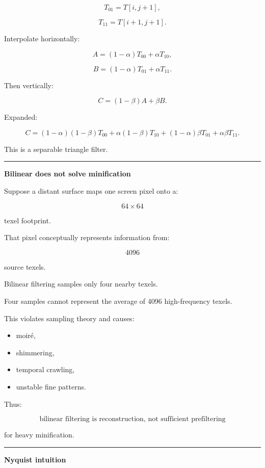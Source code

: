 \[
T_{01}=T[i,j+1],
\]

\[
T_{11}=T[i+1,j+1].
\]

Interpolate horizontally:

\[
A=(1-\alpha)T_{00}+\alpha T_{10},
\]

\[
B=(1-\alpha)T_{01}+\alpha T_{11}.
\]

Then vertically:

\[
\boxed{
C=(1-\beta)A+\beta B.
}
\]

Expanded:

\[
C=
(1-\alpha)(1-\beta)T_{00}
+
\alpha(1-\beta)T_{10}
+
(1-\alpha)\beta T_{01}
+
\alpha\beta T_{11}.
\]

This is a separable triangle filter.

\begin{center}\rule{0.5\linewidth}{0.5pt}\end{center}

\textbf{Bilinear does not solve minification}

Suppose a distant surface maps one screen pixel onto a:

\[
64\times64
\]

texel footprint.

That pixel conceptually represents information from:

\[
4096
\]

source texels.

Bilinear filtering samples only four nearby texels.

Four samples cannot represent the average of 4096 high-frequency texels.

This violates sampling theory and causes:

\begin{itemize}
\tightlist
\item
  moiré,
\item
  shimmering,
\item
  temporal crawling,
\item
  unstable fine patterns.
\end{itemize}

Thus:

\[
\boxed{\text{bilinear filtering is reconstruction, not sufficient prefiltering}}
\]

for heavy minification.

\begin{center}\rule{0.5\linewidth}{0.5pt}\end{center}

\textbf{Nyquist intuition}

